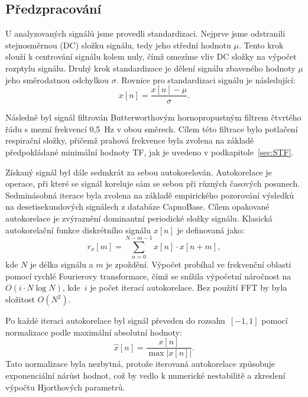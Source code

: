 \subsection*{Předzpracování}
\label{sec:predzpracovani}
U analyzovaných signálů jsme provedli standardizaci.
Nejprve jsme odstranili stejnosměrnou (\acs{DC}) složku signálu, tedy jeho střední hodnotu \(\mu\).
Tento krok slouží k centrování signálu kolem nuly, čímž omezíme vliv \acs{DC} složky na výpočet rozptylu signálu.
Druhý krok standardizace je dělení signálu zbaveného hodnoty \(\mu\) jeho směrodatnou odchylkou \(\sigma\).
Rovnice pro standardizaci signálu je následující:
\begin{equation}
	\label{eq:standardizace}
	x[n] = \frac{x[n] - \mu}{\sigma}.
\end{equation}

Následně byl signál filtrován Butterworthovým hornopropustným filtrem čtvrtého řádu s mezní frekvencí 0,5~Hz v obou směrech.
Cílem této filtrace bylo potlačení respirační složky, přičemž prahová frekvence byla zvolena na základě předpokládané minimální hodnoty \acs{TF}, jak je uvedeno v podkapitole~\ref{sec:STF}.

Získaný signál byl dále sedmkrát za sebou autokorelován.
Autokorelace je operace, při které se signál koreluje sám se sebou při různých časových posunech.
Sedminásobná iterace byla zvolena na základě empirického pozorování výsledků na desetisekundových signálech z databáze CapnoBase.
Cílem opakované autokorelace je zvýraznění dominantní periodické složky signálu.
Klasická autokorelační funkce diskrétního signálu \( x[n] \) je definovaná jako:
\begin{equation}
	r_x[m] = \sum_{n=0}^{N-m-1} x[n] \cdot x[n+m],
\end{equation}
kde \( N \) je délka signálu a \( m \) je zpoždění.
Výpočet probíhal ve frekvenční oblasti pomocí rychlé Fourierovy transformace, čímž se snížila výpočetní náročnost na~\(O(i \cdot N \log N)\), kde~\(i\) je počet iterací autokorelace.
Bez použití \acs{FFT} by byla složitost \(O(N^2)\).

Po každé iteraci autokorelace byl signál převeden do rozsahu~\([-1, 1]\) pomocí normalizace podle maximální absolutní hodnoty:
\begin{equation}
	\hat{x}[n] = \frac{x[n]}{\max |x[n]|}.
\end{equation}
Tato normalizace byla nezbytná, protože iterovaná autokorelace způsobuje exponenciální nárůst hodnot, což by vedlo k numerické nestabilitě a zkreslení výpočtu Hjorthových parametrů.

